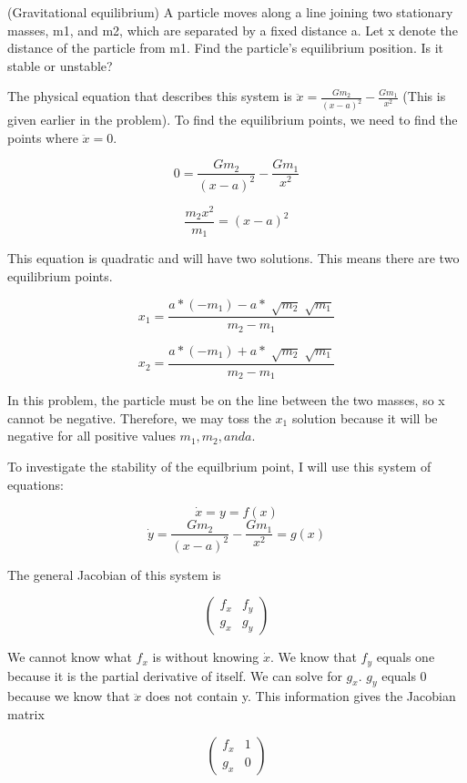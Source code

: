\documentclass[11pt,answers]{exam}
\begin{document}
\begin{questions}

\addtocounter{question}{46}
\item (Gravitational equilibrium) A particle moves along a line joining two stationary masses, m1, and m2, which are separated by a fixed distance a. Let x denote the distance of the particle from m1. Find the particle’s equilibrium position. Is it stable or unstable?

\begin{solution}
The physical equation that describes this system is $\ddot{x} = \frac{Gm_2}{(x-a)^2} - \frac{Gm_1}{x^2}$ (This is given earlier in the problem). To find the equilibrium points, we need to find the points where $\ddot{x} = 0$.

$$0 = \frac{Gm_2}{(x-a)^2} - \frac{Gm_1}{x^2}$$

$$\frac{m_2x^2}{m_1} = (x-a)^2$$

This equation is quadratic and will have two solutions. This means there are two equilibrium points.

$$x_1 = \frac{a*(-m_1) -a*\sqrt[]{m_2}\sqrt[]{m_1}}{m_2-m_1}$$

$$x_2 = \frac{a*(-m_1) +a*\sqrt[]{m_2}\sqrt[]{m_1}}{m_2-m_1}$$

In this problem, the particle must be on the line between the two masses, so x cannot be negative. Therefore, we may toss the $x_1$ solution because it will be negative for all positive values $m_1,m_2, and a$.

To investigate the stability of the equilbrium point, I will use this system of equations:

$$\dot{x} = y = f(x)$$
$$\dot{y} = \frac{Gm_2}{(x-a)^2} - \frac{Gm_1}{x^2} = g(x)$$

The general Jacobian of this system is

$$\begin{pmatrix}
f_x & f_y\\ 
g_x & g_y
\end{pmatrix}$$

We cannot know what $f_x$ is without knowing $\dot{x}$. We know that $f_y$ equals one because it is the partial derivative of itself. We can solve for $g_x$. $g_y$ equals 0 because we know that $\ddot{x}$ does not contain y. This information gives the Jacobian matrix

$$\begin{pmatrix}
f_x & 1\\ 
g_x & 0
\end{pmatrix}$$


\end{solution}
\end{questions}
\end{document}
